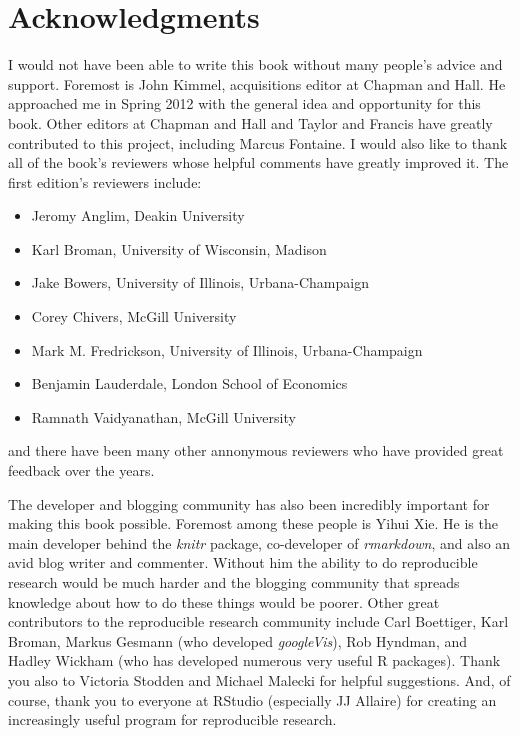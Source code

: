 \documentclass[]{krantz}
\providecommand{\tightlist}{%
  \setlength{\itemsep}{0pt}\setlength{\parskip}{0pt}}
\theoremstyle{definition}
\theoremstyle{definition}
\theoremstyle{definition}
\theoremstyle{remark}
\begin{document}
\hypertarget{acknowledgments}{%
\section*{Acknowledgments}\label{acknowledgments}}


I would not have been able to write this book without many people's
advice and support. Foremost is John Kimmel, acquisitions editor at
Chapman and Hall. He approached me in Spring 2012 with the general idea
and opportunity for this book. Other editors at Chapman and Hall and
Taylor and Francis have greatly contributed to this project, including
Marcus Fontaine. I would also like to thank all of the book's reviewers
whose helpful comments have greatly improved it. The first edition's
reviewers include:

\begin{itemize}
\tightlist
\item
  Jeromy Anglim, Deakin University
\item
  Karl Broman, University of Wisconsin, Madison
\item
  Jake Bowers, University of Illinois, Urbana-Champaign
\item
  Corey Chivers, McGill University
\item
  Mark M. Fredrickson, University of Illinois, Urbana-Champaign
\item
  Benjamin Lauderdale, London School of Economics
\item
  Ramnath Vaidyanathan, McGill University
\end{itemize}

and there have been many other annonymous reviewers who have provided
great feedback over the years.

The developer and blogging community has also been incredibly important
for making this book possible. Foremost among these people is Yihui Xie.
He is the main developer behind the \emph{knitr} package, co-developer
of \emph{rmarkdown}, and also an avid blog writer and commenter. Without
him the ability to do reproducible research would be much harder and the
blogging community that spreads knowledge about how to do these things
would be poorer. Other great contributors to the reproducible research
community include Carl Boettiger, Karl Broman, Markus Gesmann (who
developed \emph{googleVis}), Rob Hyndman, and Hadley Wickham (who has
developed numerous very useful R packages). Thank you also to Victoria
Stodden and Michael Malecki for helpful suggestions. And, of course,
thank you to everyone at RStudio (especially JJ Allaire) for creating an
increasingly useful program for reproducible research.
\end{document}
